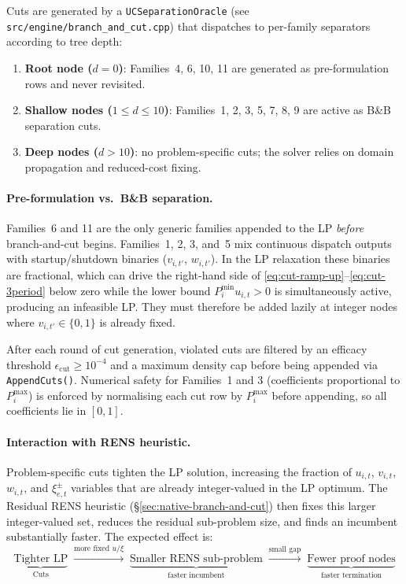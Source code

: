 Cuts are generated by a \texttt{UCSeparationOracle} (see
\texttt{src/engine/branch\_and\_cut.cpp}) that dispatches to per-family
separators according to tree depth:

\begin{enumerate}
  \item \textbf{Root node ($d=0$)}: Families~4, 6, 10, 11 are generated
        as pre-formulation rows and never revisited.
  \item \textbf{Shallow nodes ($1 \leq d \leq 10$)}: Families~1, 2, 3, 5,
        7, 8, 9 are active as B\&B separation cuts.
  \item \textbf{Deep nodes ($d > 10$)}: no problem-specific cuts; the
        solver relies on domain propagation and reduced-cost fixing.
\end{enumerate}

\paragraph{Pre-formulation vs.~B\&B separation.}
Families~6 and 11 are the only generic families appended to the
LP \emph{before} branch-and-cut begins.  Families~1, 2, 3, and~5 mix
continuous dispatch outputs with startup/shutdown binaries
($v_{i,t'}$, $w_{i,t'}$).  In the LP relaxation these binaries are
fractional, which can drive the right-hand side of
\eqref{eq:cut-ramp-up}--\eqref{eq:cut-3period} below zero
while the lower bound $P^{\min}_i u_{i,t} > 0$ is simultaneously active,
producing an infeasible LP.  They must therefore be added lazily
at integer nodes where $v_{i,t'} \in \{0,1\}$ is already fixed.

After each round of cut generation, violated cuts are filtered by an
efficacy threshold $\epsilon_{\mathrm{cut}} \geq 10^{-4}$ and a maximum
density cap before being appended via \texttt{AppendCuts()}.
Numerical safety for Families~1 and 3 (coefficients proportional to
$P^{\max}_i$) is enforced by normalising each cut row by $P^{\max}_i$
before appending, so all coefficients lie in $[0,1]$.

\paragraph{Interaction with RENS heuristic.}
Problem-specific cuts tighten the LP solution, increasing the fraction of
$u_{i,t}$, $v_{i,t}$, $w_{i,t}$, and $\xi^{\pm}_{e,t}$ variables that are
already integer-valued in the LP optimum.  The Residual RENS heuristic
(§\ref{sec:native-branch-and-cut}) then fixes this larger integer-valued
set, reduces the residual sub-problem size, and finds an incumbent
substantially faster.  The expected effect is:
\begin{equation}
  \underbrace{\text{Tighter LP}}_{\text{Cuts}}
  \;\xrightarrow{\text{more fixed }u/\xi}\;
  \underbrace{\text{Smaller RENS sub-problem}}_{\text{faster incumbent}}
  \;\xrightarrow{\text{small gap}}\;
  \underbrace{\text{Fewer proof nodes}}_{\text{faster termination}}
\end{equation}

